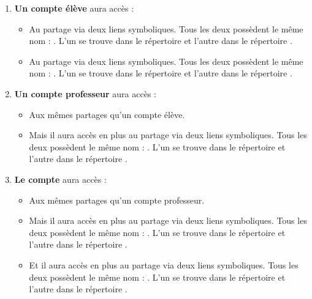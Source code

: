 \begin{enumerate}
\item \textbf{Un compte élève} aura accès :
\begin{itemize}
\item Au partage  via deux liens
symboliques. Tous les deux possèdent le même nom : 
\og {} \fg{}.
L'un se trouve dans le répertoire  et l'autre
dans le répertoire .

\item Au partage  via deux liens
symboliques. Tous les deux possèdent le même nom : 
\og {} \fg{}.
L'un se trouve dans le répertoire  et l'autre
dans le répertoire .
\end{itemize}

\item \textbf{Un compte professeur} aura accès :
\begin{itemize}
\item Aux mêmes partages qu'un compte élève.
\item Mais il aura accès en plus au 
partage  via deux liens
symboliques. Tous les deux possèdent le même nom : 
\og {} \fg{}.
L'un se trouve dans le répertoire  et l'autre
dans le répertoire .
\end{itemize}

\item \textbf{Le compte } aura accès :
\begin{itemize}
\item Aux mêmes partages qu'un compte professeur.
\item Mais il aura accès en plus au 
partage  via deux liens
symboliques. Tous les deux possèdent le même nom : 
\og {} \fg{}.
L'un se trouve dans le répertoire  et l'autre
dans le répertoire .
\item Et il aura accès en plus au 
partage  via deux liens
symboliques. Tous les deux possèdent le même nom : 
\og {} \fg{}.
L'un se trouve dans le répertoire  et l'autre
dans le répertoire .
\end{itemize}

\end{enumerate}











